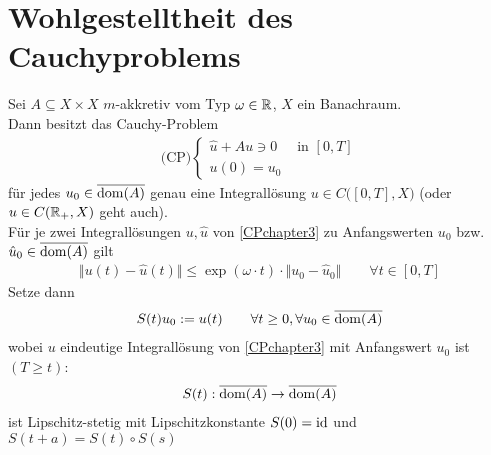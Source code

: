 
\chapter{Wohlgestelltheit des Cauchyproblems} %
\setcounter{section}{1}
\begin{theorem}\label{theoremCrandall-Liggett}\enter
Sei $A\subseteq X\times X$ $m$-akkretiv vom Typ $\omega\in\mathbb{R}$, $X$ ein Banachraum.\\
Dann besitzt das Cauchy-Problem
\begin{align}\label{CPchapter3}\tag{CP}
\text{(CP)}\left\lbrace\begin{array}{rl}
\hat{u}+Au\ni 0&\text{ in }[0,T]\\
u(0)=u_0&
\end{array}\right.
\end{align}
für jedes $u_0\in\overline{\operatorname{dom}(A)}$ genau eine Integrallösung $u\in C\big([0,T],X\big)$ (oder $u\in C(\mathbb{R}_+,X)$ geht auch).\\
Für je zwei Integrallösungen $u,\hat{u}$ von \eqref{CPchapter3} zu Anfangswerten $u_0$ bzw. $\hat{u}_0\in\overline{\operatorname{dom}(A)}$ gilt
\begin{align*}
\big\Vert u(t)-\hat{u}(t)\big\Vert
\leq\exp(\omega\cdot t)\cdot\big\Vert u_0-\hat{u}_0\big\Vert\qquad\forall t\in[0,T]
\end{align*}
Setze dann
\begin{align*}
S(t)u_0:=u(t)\qquad\forall t\geq0,\forall u_0\in\overline{\operatorname{dom}(A)}
\end{align*}
wobei $u$ eindeutige Integrallösung von \eqref{CPchapter3} mit Anfangswert $u_0$ ist $(T\geq t)$:
\begin{align*}
S(t):\overline{\operatorname{dom}(A)}\to\overline{\operatorname{dom}(A)}
\end{align*}
ist Lipschitz-stetig mit Lipschitzkonstante $S(0)=\operatorname{id}$ und $S(t+a)=S(t)\circ S(s)$
\end{theorem}

